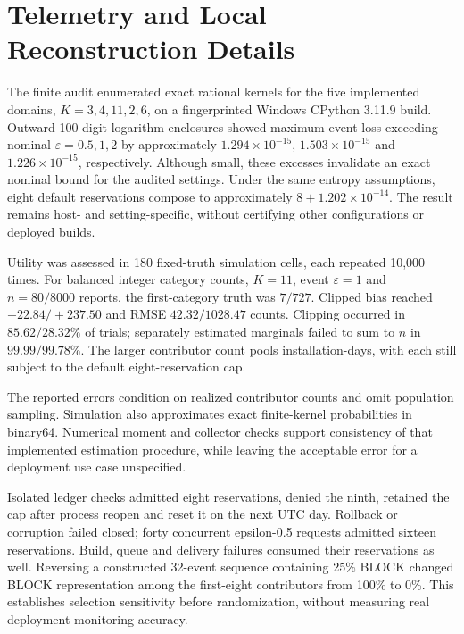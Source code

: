 \documentclass[conference]{IEEEtran}
\begin{document}
\section{Telemetry and Local Reconstruction Details}
\label{app:telemetry_reconstruction}
The finite audit enumerated exact rational kernels for the five implemented domains, $K=3,4,11,2,6$, on a fingerprinted Windows CPython 3.11.9 build. Outward 100-digit logarithm enclosures showed maximum event loss exceeding nominal $\varepsilon=0.5,1,2$ by approximately $1.294\times10^{-15}$, $1.503\times10^{-15}$ and $1.226\times10^{-15}$, respectively. Although small, these excesses invalidate an exact nominal bound for the audited settings. Under the same entropy assumptions, eight default reservations compose to approximately $8+1.202\times10^{-14}$. The result remains host- and setting-specific, without certifying other configurations or deployed builds.

Utility was assessed in 180 fixed-truth simulation cells, each repeated 10,000 times. For balanced integer category counts, $K=11$, event $\varepsilon=1$ and $n=80/8000$ reports, the first-category truth was $7/727$. Clipped bias reached $+22.84/+237.50$ and RMSE $42.32/1028.47$ counts. Clipping occurred in $85.62/28.32\%$ of trials; separately estimated marginals failed to sum to $n$ in $99.99/99.78\%$. The larger contributor count pools installation-days, with each still subject to the default eight-reservation cap.

The reported errors condition on realized contributor counts and omit population sampling. Simulation also approximates exact finite-kernel probabilities in binary64. Numerical moment and collector checks support consistency of that implemented estimation procedure, while leaving the acceptable error for a deployment use case unspecified.

Isolated ledger checks admitted eight reservations, denied the ninth, retained the cap after process reopen and reset it on the next UTC day. Rollback or corruption failed closed; forty concurrent epsilon-0.5 requests admitted sixteen reservations. Build, queue and delivery failures consumed their reservations as well. Reversing a constructed 32-event sequence containing 25\% BLOCK changed BLOCK representation among the first-eight contributors from 100\% to 0\%. This establishes selection sensitivity before randomization, without measuring real deployment monitoring accuracy.
\end{document}
